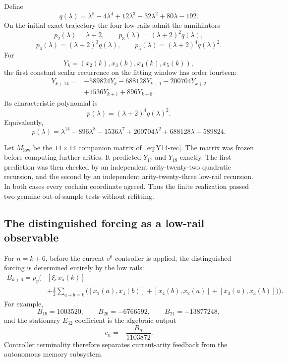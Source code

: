 \documentclass[11pt]{amsart}
\begin{document}
Define
\[
q(\lambda)=
\lambda^5-4\lambda^4+12\lambda^3-32\lambda^2+80\lambda-192.
\]
On the initial exact trajectory the four low rails admit the annihilators
\[
p_2(\lambda)=\lambda+2,
\qquad
p_3(\lambda)=(\lambda+2)^2q(\lambda),
\]
\[
p_4(\lambda)=(\lambda+2)^3q(\lambda),
\qquad
p_5(\lambda)=(\lambda+2)^4q(\lambda)^2.
\]
For
\[
Y_k=(x_2(k),x_3(k),x_4(k),x_5(k)),
\]
the first constant scalar recurrence on the fitting window has order fourteen:
\begin{equation}\label{eq:Y14-rec}
\boxed{
\begin{aligned}
Y_{k+14}={}&-589824Y_k-688128Y_{k+1}-200704Y_{k+2}\\
&+1536Y_{k+7}+896Y_{k+8}.
\end{aligned}}
\end{equation}
Its characteristic polynomial is
\begin{equation}\label{eq:low-poly}
\boxed{
p(\lambda)=(\lambda+2)^4q(\lambda)^2.
}
\end{equation}
Equivalently,
\[
p(\lambda)=
\lambda^{14}-896\lambda^8-1536\lambda^7
+200704\lambda^2+688128\lambda+589824.
\]

Let $M_{\mathrm{low}}$ be the $14\times14$ companion matrix of~\eqref{eq:Y14-rec}.  The matrix was frozen before computing further arities.  It predicted $Y_{17}$ and $Y_{18}$ exactly.  The first prediction was then checked by an independent arity-twenty-two quadratic recursion, and the second by an independent arity-twenty-three low-rail recursion.  In both cases every cochain coordinate agreed.  Thus the finite realization passed two genuine out-of-sample tests without refitting.

\subsection{The distinguished forcing as a low-rail observable}

For $n=k+6$, before the current $v^6$ controller is applied, the distinguished forcing is determined entirely by the low rails:
\begin{equation}\label{eq:B-low-observable}
\boxed{
\begin{aligned}
B_{k+6}=p_\eta\Bigg(&[\xi,x_5(k)]\\
&+\frac12\sum_{a+b=k}
\Big([x_2(a),x_4(b)]+[x_4(b),x_2(a)]+[x_3(a),x_3(b)]\Big)
\Bigg).
\end{aligned}}
\end{equation}
For example,
\[
B_{19}=1003520,
\qquad
B_{20}=-6766592,
\qquad
B_{21}=-13877248,
\]
and the stationary $E_{32}$ coefficient is the algebraic output
\begin{equation}\label{eq:c-from-B}
\boxed{c_n=-\frac{B_n}{1103872}.}
\end{equation}
Controller terminality therefore separates current-arity feedback from the autonomous memory subsystem.
\end{document}
